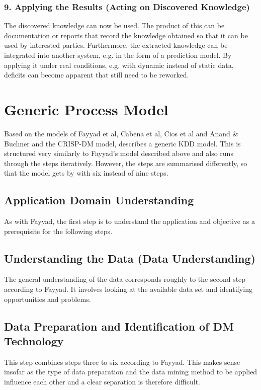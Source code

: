 \subsubsection{9. Applying the Results (Acting on Discovered Knowledge)}

The discovered knowledge can now be used. The product of this can be documentation or reports that record the knowledge obtained so that it can be used by interested parties. Furthermore, the extracted knowledge can be integrated into another system, e.g. in the form of a prediction model. By applying it under real conditions, e.g. with dynamic instead of static data, deficits can become apparent that still need to be reworked. \cite{Fayyad:1996,Maimon:2010}

\section{Generic Process Model}

Based on the models of Fayyad et al, Cabena et al, Cios et al and Anand \& Buchner and the CRISP-DM model, \cite{Kurgan:2006} describes a generic KDD model. This is structured very similarly to Fayyad's model described above and also runs through the steps iteratively. However, the steps are summarised differently, so that the model gets by with six instead of nine steps. 

\subsection{Application Domain Understanding}

As with Fayyad, the first step is to understand the application and objective as a prerequisite for the following steps.

\subsection{Understanding the Data (Data Understanding)}

The general understanding of the data corresponds roughly to the second step according to Fayyad. It involves looking at the available data set and identifying opportunities and problems.

\subsection{Data Preparation and Identification of DM Technology}

This step combines steps three to six according to Fayyad. This makes sense insofar as the type of data preparation and the data mining method to be applied influence each other and a clear separation is therefore difficult.


